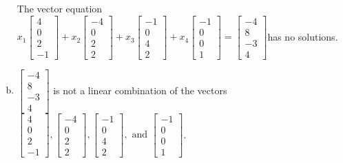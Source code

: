 \begin{exerciseAnswer}
\begin{enumerate}[(a)]
\begin{center}
\begin{minipage}{0.8\textwidth}
 The vector equation \( x_{1} \left[\begin{array}{c}
4 \\
0 \\
2 \\
-1
\end{array}\right] + x_{2} \left[\begin{array}{c}
-4 \\
0 \\
2 \\
2
\end{array}\right] + x_{3} \left[\begin{array}{c}
-1 \\
0 \\
4 \\
2
\end{array}\right] + x_{4} \left[\begin{array}{c}
-1 \\
0 \\
0 \\
1
\end{array}\right] = \left[\begin{array}{c}
-4 \\
8 \\
-3 \\
4
\end{array}\right] \)has no solutions.
\end{minipage}\end{center}
    
\item 

\( \left[\begin{array}{c}
-4 \\
8 \\
-3 \\
4
\end{array}\right] \) is not a linear combination of the vectors \( \left[\begin{array}{c}
4 \\
0 \\
2 \\
-1
\end{array}\right] , \left[\begin{array}{c}
-4 \\
0 \\
2 \\
2
\end{array}\right] , \left[\begin{array}{c}
-1 \\
0 \\
4 \\
2
\end{array}\right] , \text{ and } \left[\begin{array}{c}
-1 \\
0 \\
0 \\
1
\end{array}\right] \). 


\end{enumerate}
    
\end{exerciseAnswer}
    
